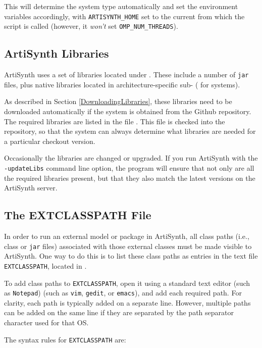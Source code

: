 This will determine the system type automatically and set the
environment variables accordingly, with {\tt ARTISYNTH\_HOME} set to the
current \directory{} from which the script is called (however,
it {\it won't} set {\tt OMP\_NUM\_THREADS}).
\fi

\subsection{ArtiSynth Libraries}

ArtiSynth uses a set of libraries located under
.  These include a number of {\tt jar}
files, plus native libraries located in architecture-specific
sub-\directories{} ({\tt \ARCH{}} for \FULLSYSTEM{} systems).

As described in Section \ref{DownloadingLibraries}, these libraries
need to be downloaded automatically if the system is obtained from the
Github repository. The required libraries are listed in the file
. This file is checked
into the repository, so that the system can always determine what
libraries are needed for a particular checkout version.

Occasionally the libraries are changed or upgraded.  If you run
ArtiSynth with the {\tt -updateLibs} command line option, the program
will ensure that not only are all the required libraries present, but
that they also match the latest versions on the ArtiSynth server.

\subsection{The EXTCLASSPATH File}
\label{EXTCLASSPATHFile}

In order to run an external model or package in ArtiSynth, all class
paths (i.e., class \directories{} or {\tt jar} files) associated with
those external classes must be made visible to ArtiSynth. One way to
do this is to list these class paths as entries in the text file {\tt
EXTCLASSPATH}, located in \ArtHome[].

To add class paths to {\tt EXTCLASSPATH}, open it using a
standard text editor
\ifWindows
(such as {\tt Notepad})
\else
(such as {\tt vim}, {\tt gedit}, or {\tt emacs}),
\fi
and add each required path. For clarity, each path is typically
added on a separate line. However, multiple paths can be
added on the same line if they are separated by the
path separator character used for that OS.

The syntax rules for {\tt EXTCLASSPATH} are:

